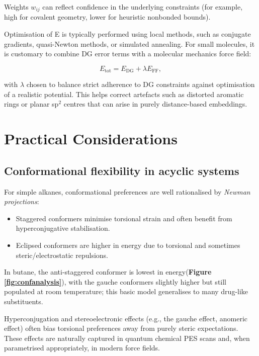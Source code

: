 \documentclass[12pt]{article}
\begin{document}
\begin{enumerate}
Weights $w_{ij}$ can reflect confidence in the underlying constraints (for example, high for covalent geometry, lower for heuristic nonbonded bounds)\cite{CH2_crippen_chem_dg_1991,CH2_havel_dg_review_1998}.

Optimisation of E is typically performed using local methods, such as conjugate gradients, quasi-Newton methods, or simulated annealing. For small molecules, it is customary to combine DG error terms with a molecular mechanics force field:

\begin{equation}
    E_{\text{tot}} = E_{\text{DG}} + \lambda E_{\text{FF}},
  \label{eq:DG_OPT}
\end{equation}

with $\lambda$ chosen to balance strict adherence to DG constraints against optimisation of a realistic potential\cite{CH2_spellmeyer_dg_conf_1997}. This helps correct artefacts such as distorted aromatic rings or planar sp$^2$ centres that can arise in purely distance-based embeddings\cite{CH2_riniker_landrum_2015}.
\end{enumerate}


\section{Practical Considerations}

\subsection{Conformational flexibility in acyclic systems}

For simple alkanes, conformational preferences are well rationalised by
\emph{Newman projections}:
\begin{itemize}
\item Staggered conformers minimise torsional strain and often benefit from
hyperconjugative stabilisation.
\item Eclipsed conformers are higher in energy due to torsional and sometimes
steric/electrostatic repulsions.
\end{itemize}

In butane, the anti-staggered conformer is lowest in energy(\textbf{Figure \ref{fig:confanalysis}}), with the gauche conformers slightly higher but still populated at room temperature; this basic model generalises to many drug-like substituents.

Hyperconjugation and stereoelectronic effects (e.g., the gauche effect,
anomeric effect) often bias torsional preferences away from purely steric
expectations. These effects are naturally captured in quantum chemical PES
scans and, when parametrised appropriately, in modern force fields.
\end{document}
